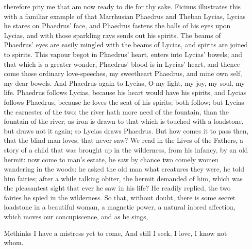 therefore pity me that am now ready to die for thy sake. Ficinus
illustrates this with a familiar example of that Marrhusian Phaedrus
and Theban Lycias, Lycias he stares on Phaedrus' face, and
Phaedrus fastens the balls of his eyes upon Lycias, and with those
sparkling rays sends out his spirits. The beams of Phaedrus' eyes are
easily mingled with the beams of Lycias, and spirits are joined to
spirits. This vapour begot in Phaedrus' heart, enters into Lycias'
bowels; and that which is a greater wonder, Phaedrus' blood is in
Lycias' heart, and thence come those ordinary love-speeches, my
sweetheart Phaedrus, and mine own self, my dear bowels. And Phaedrus
again to Lycias, O my light, my joy, my soul, my life. Phaedrus follows
Lycias, because his heart would have his spirits, and Lycias follows
Phaedrus, because he loves the seat of his spirits; both follow; but
Lycias the earnester of the two: the river hath more need of the
fountain, than the fountain of the river; as iron is drawn to that
which is touched with a loadstone, but draws not it again; so Lycias
draws Phaedrus. But how comes it to pass then, that the blind man
loves, that never saw? We read in the Lives of the Fathers, a story of
a child that was brought up in the wilderness, from his infancy, by an
old hermit: now come to man's estate, he saw by chance two comely women
wandering in the woods: he asked the old man what creatures they were,
he told him fairies; after a while talking obiter, the hermit demanded
of him, which was the pleasantest sight that ever he saw in his life?
He readily replied, the two fairies he spied in the wilderness.
So that, without doubt, there is some secret loadstone in a beautiful
woman, a magnetic power, a natural inbred affection, which moves our
concupiscence, and as he sings,

Methinks I have a mistress yet to come,
And still I seek, I love, I know not whom.

